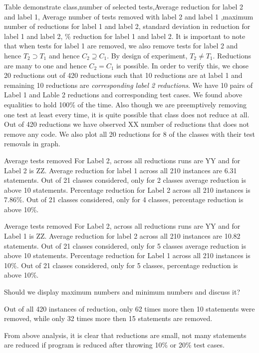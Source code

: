 Table demonstrate class,number of selected tests,Average reduction for label 2 and label 1,  Average number of tests removed with label 2 and label 1 ,maximum number of reductions for label 1 and  label 2, standard deviation in reduction for label 1 and label 2, \% reduction for label 1 and label 2.  It is important to note that when tests for label 1 are removed, we also remove tests for label 2 and hence $T_{2} \supset T_{1}$ and hence $C_2 \supseteq C_1$. By design of experiment, $T_{2} \neq T_{1}$. Reductions are many to one and hence $C_2 = C_1$ is possible. In order to verify this, we chose 20 reductions out of 420 reductions such that 10 reductions are at label 1 and remaining 10 reductions are \emph{corresponding label 2 reductions}. We have 10 pairs of Label 1 and Lable 2 reductions and corresponding test cases. We found above equalities to hold 100\% of the time. Also though we are preemptively removing one test at least every time, it is quite possible that class does not reduce at all. Out of 420 reductions we have observed XX number of reductions that does not remove any code.  We also plot all 20 reductions for 8 of the classes with their test removals in graph.

Average tests removed For Label 2, across all reductions runs are YY and for Label 2 is ZZ. Average reduction for label 1 across all 210 instances are 6.31 statements. Out of 21 classes considered, only for 2 classes average reduction is above 10 statements. Percentage reduction for Label 2 across all 210 instances is 7.86\%. Out of 21 classes considered, only for 4 classes, percentage reduction is above 10\%. 

Average tests removed For Label 2, across all reductions runs are YY and for Label 1 is ZZ. Average reduction for label 2 across all 210 instances are 10.82 statements. Out of 21 classes considered, only for 5 classes average reduction is above 10 statements. Percentage reduction for Label 1 across all 210 instances is 10\%. Out of 21 classes considered, only for 5 classes, percentage reduction is above 10\%. 

Should we display maximum numbers and minimum numbers and discuss it?

Out of all 420 instances of reduction, only 62 times more then 10 statements were removed, while only 32 times more then 15 statements are removed.

From above analysis, it is clear that reductions are small, not many statements are reduced if program is reduced after throwing 10\% or 20\% test cases. 

   

